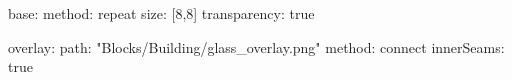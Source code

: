 base:
  method: repeat
  size: [8,8]
  transparency: true

overlay:
  path: "Blocks/Building/glass_overlay.png"
  method: connect
  innerSeams: true
